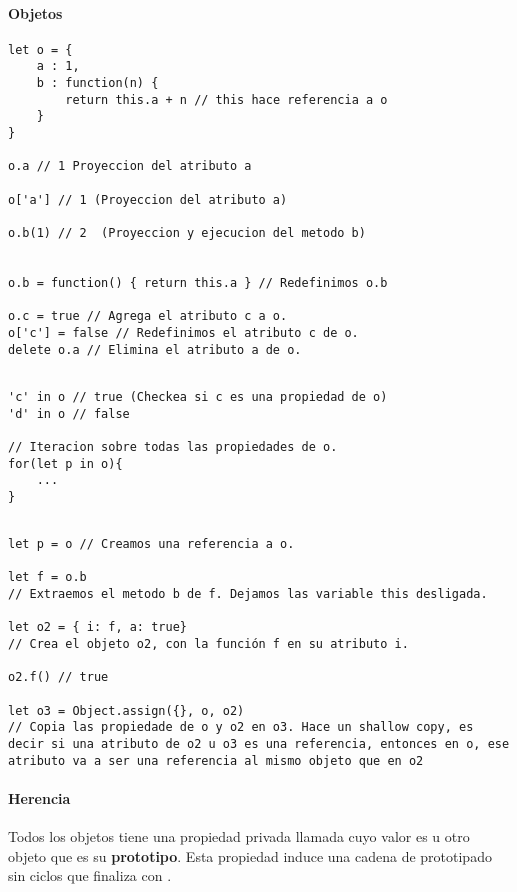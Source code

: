 \paragraph{Objetos}
\begin{centrado}
\begin{verbatim}
let o = {
    a : 1,
    b : function(n) {
        return this.a + n // this hace referencia a o
    }
}

o.a // 1 Proyeccion del atributo a

o['a'] // 1 (Proyeccion del atributo a)

o.b(1) // 2  (Proyeccion y ejecucion del metodo b)


o.b = function() { return this.a } // Redefinimos o.b

o.c = true // Agrega el atributo c a o.
o['c'] = false // Redefinimos el atributo c de o.
delete o.a // Elimina el atributo a de o.


\end{verbatim}
\end{centrado}

\begin{centrado}
\begin{verbatim}
'c' in o // true (Checkea si c es una propiedad de o)
'd' in o // false

// Iteracion sobre todas las propiedades de o.
for(let p in o){
    ...
}
\end{verbatim}
\end{centrado}
\begin{centrado}
\begin{verbatim}

let p = o // Creamos una referencia a o.

let f = o.b 
// Extraemos el metodo b de f. Dejamos las variable this desligada.

let o2 = { i: f, a: true} 
// Crea el objeto o2, con la función f en su atributo i.

o2.f() // true

let o3 = Object.assign({}, o, o2) 
// Copia las propiedade de o y o2 en o3. Hace un shallow copy, es decir si una atributo de o2 u o3 es una referencia, entonces en o, ese atributo va a ser una referencia al mismo objeto que en o2
\end{verbatim}
\end{centrado}

\paragraph{Herencia}
Todos los objetos tiene una propiedad privada llamada \javascript{[[Prototype]]} cuyo valor es  u otro objeto que es su \textbf{prototipo}. Esta propiedad induce una cadena de prototipado sin ciclos que finaliza con .

